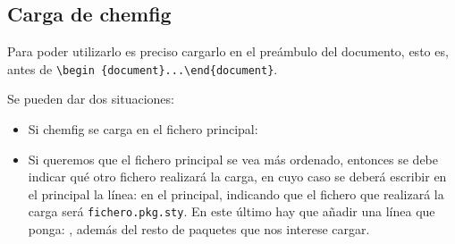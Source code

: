 \subsection{Carga de \textsf{chemfig}}
Para poder utilizarlo es preciso cargarlo en el preámbulo del documento, esto es,
antes de \texttt{\textbackslash begin
  \{document\}...\textbackslash end\{document\}}.

Se pueden dar dos situaciones:
\vspace{-1ex}
\begin{itemize}
\item Si \textsf{chemfig} se carga en el fichero principal:
\item Si queremos que el fichero principal se vea más ordenado, entonces se debe
  indicar qué otro fichero realizará la carga, en cuyo caso se deberá escribir en
  el principal la línea: 
   en el
  principal, indicando que el fichero que realizará la carga será 
 \texttt{fichero.pkg.sty}. En este último hay que añadir una línea que ponga:
 ,
 además del resto de paquetes que nos interese cargar.
\end{itemize}

\vspace{3ex}

